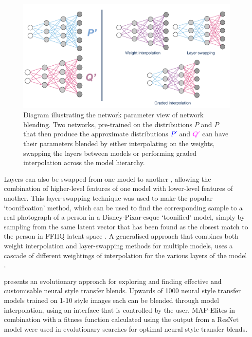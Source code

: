 \begin{figure}[!htbp]
    \centering
    \includegraphics[width=1\textwidth]{figures/c6_active_div/diagrams/network_blending.png}
    \caption[Diagram illustrating the network parameter view of network blending.]{Diagram illustrating the network parameter view of network blending. Two networks, pre-trained on the distributions $P$ and $P$ that then produce the approximate distributions \textcolor{blue}{$P'$} and \textcolor{magenta}{$Q'$} can have their parameters blended by either interpolating on the weights, swapping the layers between models or performing graded interpolation across the model hierarchy.}
  \label{fig:c6:network-blending}
  \end{figure}

Layers can also be swapped from one model to another \citep{pinkney2020interpolation}, allowing the combination of higher-level features of one model with lower-level features of another. 
This layer-swapping technique was used to make the popular `toonification' method, which can be used to find the corresponding sample to a real photograph of a person in a Disney-Pixar-esque `toonified' model, simply by sampling from the same latent vector that has been found as the closest match to the person in FFHQ latent space \citep{abdal2019image2stylegan}. 
A generalised approach that combines both weight interpolation and layer-swapping methods for multiple models, uses a cascade of different weightings of interpolation for the various layers of the model \citep{arfafax2020barycentricnotebook}.

\citet{colton2021evolving} presents an evolutionary approach for exploring and finding effective and customisable neural style transfer blends. 
Upwards of 1000 neural style transfer models trained on 1-10 style images each can be blended through model interpolation, using an interface that is controlled by the user. 
MAP-Elites \citep{mouret2015illuminating} in combination with a fitness function calculated using the output from a ResNet model \citep{he2016deep} were used in evolutionary searches for optimal neural style transfer blends. 

